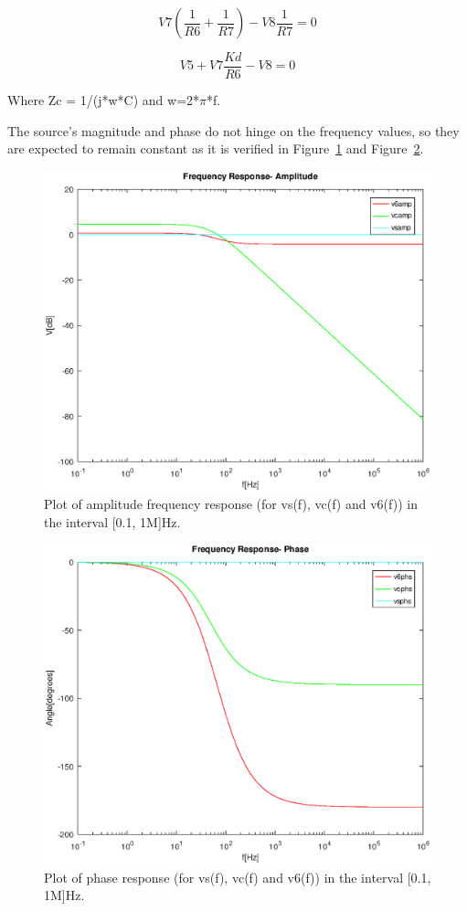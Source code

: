 \begin{equation}
  V7(\frac{1}{R6}+\frac{1}{R7}) - V8\frac{1}{R7}= 0
\end{equation}

\begin{equation}
  V5 + V7\frac{Kd}{R6} - V8 = 0
\end{equation}

Where Zc = 1/(j*w*C) and w=2*$\pi$*f.

The source's magnitude and phase do not hinge on the frequency values, so they are expected to remain constant as it is verified in Figure~\ref{fig:plotA(61)} and Figure~\ref{fig:plotA(62)}.

\begin{figure}[h] \centering
\includegraphics[width=0.6\linewidth]{FrequencyResponseAmplitude.eps}
\caption{Plot of amplitude frequency response (for vs(f), vc(f) and v6(f)) in the interval [0.1, 1M]Hz.}
\label{fig:plotA(61)}
\end{figure}

\begin{figure}[h] \centering
\includegraphics[width=0.6\linewidth]{FrequencyResponsePhase.eps}
\caption{Plot of phase response (for vs(f), vc(f) and v6(f)) in the interval [0.1, 1M]Hz.}
\label{fig:plotA(62)}
\end{figure}

